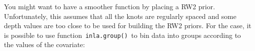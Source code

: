 \documentclass[
  letterpaper,
  DIV=11,
  numbers=noendperiod]{scrartcl}
\newenvironment{Shaded}{\begin{snugshade}}{\end{snugshade}}
\newcommand{\AttributeTok}[1]{\textcolor[rgb]{0.40,0.45,0.13}{#1}}
\newcommand{\DecValTok}[1]{\textcolor[rgb]{0.68,0.00,0.00}{#1}}
\newcommand{\FunctionTok}[1]{\textcolor[rgb]{0.28,0.35,0.67}{#1}}
\newcommand{\NormalTok}[1]{\textcolor[rgb]{0.00,0.23,0.31}{#1}}
\newcommand{\OtherTok}[1]{\textcolor[rgb]{0.00,0.23,0.31}{#1}}
\newcommand{\SpecialCharTok}[1]{\textcolor[rgb]{0.37,0.37,0.37}{#1}}
\begin{document}
You might want to have a smoother function by placing a RW2 prior.
Unfortunately, this assumes that all the knots are regularly spaced and
some depth values are too close to be used for building the RW2 priors.
For the case, it is possible to use function~\texttt{inla.group()}~to
bin data into groups according to the values of the covariate:

\begin{Shaded}
\end{Shaded}
\end{document}
